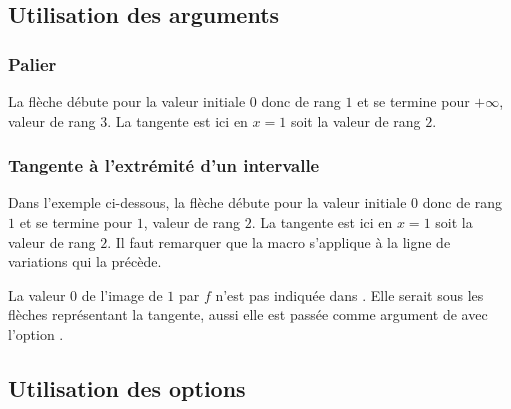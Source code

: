 \subsection{Utilisation des arguments}

\subsubsection{Palier}
La flèche débute pour la valeur initiale $0$ donc de rang $1$ et se termine pour $+\infty$, valeur de rang $3$.  La tangente est ici en $x=1$ soit la valeur de rang $2$.

\begin{tkzexample}[vbox]
\end{tkzexample}  

\subsubsection{Tangente à l'extrémité d'un intervalle}
Dans l'exemple ci-dessous, la flèche débute pour la valeur initiale $0$ donc de rang $1$ et se termine pour $1$, valeur de rang $2$. La tangente est ici en $x=1$ soit la valeur de rang $2$. Il faut remarquer que la macro  s'applique à la ligne de variations qui la précède.

La valeur $0$ de l'image de $1$ par $f$ n'est pas indiquée dans . Elle serait sous les flèches représentant la tangente, aussi elle est passée comme argument de  avec l'option .

\begin{tkzexample}[vbox]
\end{tkzexample}  

\subsection{Utilisation des options}

